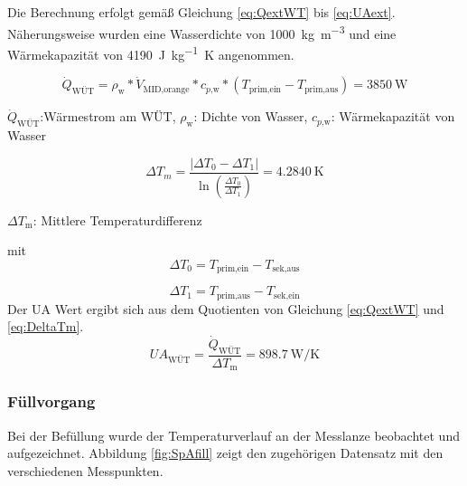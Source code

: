 Die Berechnung erfolgt gemäß Gleichung \ref{eq:QextWT} bis \ref{eq:UAext}. Näherungsweise wurden eine Wasserdichte von \SI{1000}{\kilogram\per\cubic\meter} und eine Wärmekapazität von \SI{4190}{\joule\per\kilogram\kelvin} angenommen.

\begin{equation}
	\label{eq:QextWT}
	\dot{Q}_{\text{WÜT}} = \rho_{\text{w}} * \dot{V}_{\text{MID,orange}} * c_{p\text{,w}} * (T_{\text{prim,ein}}-T_{\text{prim,aus}}) = \SI{3850}{\watt}
\end{equation}

\begin{center}
	\begin{small}
	$\dot{Q}_{\text{WÜT}}$:Wärmestrom am WÜT,	
	$\rho_{\text{w}}$:	Dichte von Wasser,
	$c_{p\text{,w}}$: Wärmekapazität von Wasser
	\end{small}
\end{center}

\begin{equation}
	\label{eq:DeltaTm}
	\Delta T_{m} = \frac{|\Delta T_{0} - \Delta T_{1}|}{\ln\left(\frac{\Delta T_{0}}{\Delta T_{1}}\right)} = \SI{4,2840}{\kelvin}
\end{equation}
\begin{center}
	\begin{small}
		$\Delta T_{\text{m}}$: Mittlere Temperaturdifferenz
	\end{small}
\end{center}

mit
\begin{equation}
	\label{eq:DeltaT0}
	\Delta T_{0} = T_{\text{prim,ein}} - T_{\text{sek,aus}}
\end{equation}

\begin{equation}
	\label{eq:DeltaT1}
	\Delta T_{1} = T_{\text{prim,aus}} - T_{\text{sek,ein}}
\end{equation}
Der UA Wert ergibt sich aus dem Quotienten von Gleichung \ref{eq:QextWT} und \ref{eq:DeltaTm}.
\begin{equation}
	\label{eq:UAext}
	\mathit{UA}_{\text{WÜT}} = \frac{\dot{Q}_{\text{WÜT}}}{\Delta T_{\text{m}}} = \SI{898,7}{\watt\per\kelvin}
\end{equation}

\subsubsection{Füllvorgang}
Bei der Befüllung wurde der Temperaturverlauf an der Messlanze beobachtet und aufgezeichnet. Abbildung \ref{fig:SpAfill} zeigt den zugehörigen Datensatz mit den verschiedenen Messpunkten.

